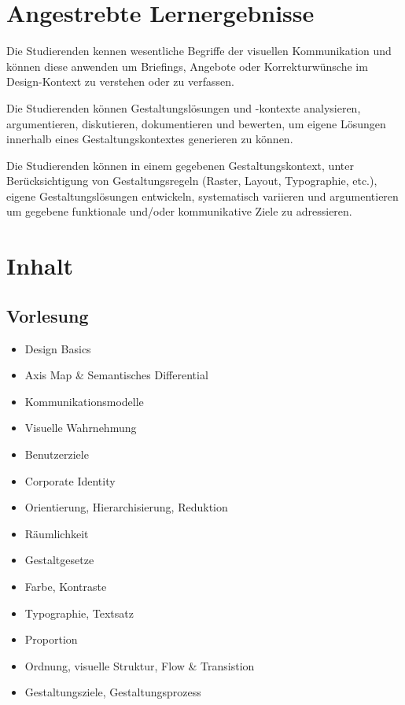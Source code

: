 \section*{Angestrebte
Lernergebnisse\label{/mi-2017/modulbeschreibungen-bachelor/BA_Screendesign}}\label{angestrebte-lernergebnissepathlabelmi-2017modulbeschreibungen-bachelorbaux5fscreendesign}

Die Studierenden kennen wesentliche Begriffe der visuellen Kommunikation
und können diese anwenden um Briefings, Angebote oder Korrekturwünsche
im Design-Kontext zu verstehen oder zu verfassen.

Die Studierenden können Gestaltungslösungen und -kontexte analysieren,
argumentieren, diskutieren, dokumentieren und bewerten, um eigene
Lösungen innerhalb eines Gestaltungskontextes generieren zu können.

Die Studierenden können in einem gegebenen Gestaltungskontext, unter
Berücksichtigung von Gestaltungsregeln (Raster, Layout, Typographie,
etc.), eigene Gestaltungslösungen entwickeln, systematisch variieren und
argumentieren um gegebene funktionale und/oder kommunikative Ziele zu
adressieren.

\section*{Inhalt\label{/mi-2017/modulbeschreibungen-bachelor/BA_Screendesign}}\label{inhaltpathlabelmi-2017modulbeschreibungen-bachelorbaux5fscreendesign}

\subsection*{Vorlesung\label{/mi-2017/modulbeschreibungen-bachelor/BA_Screendesign}}\label{vorlesungpathlabelmi-2017modulbeschreibungen-bachelorbaux5fscreendesign}

\begin{itemize}
\tightlist
\item
  Design Basics
\item
  Axis Map \& Semantisches Differential
\item
  Kommunikationsmodelle
\item
  Visuelle Wahrnehmung
\item
  Benutzerziele
\item
  Corporate Identity
\item
  Orientierung, Hierarchisierung, Reduktion
\item
  Räumlichkeit
\item
  Gestaltgesetze
\item
  Farbe, Kontraste
\item
  Typographie, Textsatz
\item
  Proportion
\item
  Ordnung, visuelle Struktur, Flow \& Transistion
\item
  Gestaltungsziele, Gestaltungsprozess
\end{itemize}

